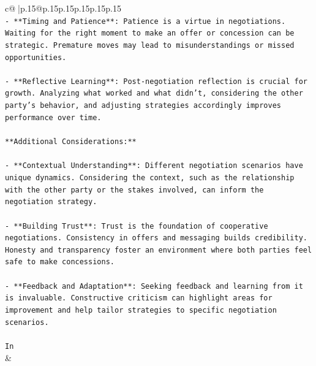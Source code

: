 \documentclass{article}
\begin{document}
{\begin{supertabular}{c@{$\;$}|p{.15\linewidth}@{}p{.15\linewidth}p{.15\linewidth}p{.15\linewidth}p{.15\linewidth}p{.15\linewidth}}
{{{\\ 
\texttt{{-} **Timing and Patience**: Patience is a virtue in negotiations. Waiting for the right moment to make an offer or concession can be strategic. Premature moves may lead to misunderstandings or missed opportunities.} \\
\\ 
\texttt{{-} **Reflective Learning**: Post{-}negotiation reflection is crucial for growth. Analyzing what worked and what didn't, considering the other party's behavior, and adjusting strategies accordingly improves performance over time.} \\
\\ 
\texttt{**Additional Considerations:**} \\
\\ 
\texttt{{-} **Contextual Understanding**: Different negotiation scenarios have unique dynamics. Considering the context, such as the relationship with the other party or the stakes involved, can inform the negotiation strategy.} \\
\\ 
\texttt{{-} **Building Trust**: Trust is the foundation of cooperative negotiations. Consistency in offers and messaging builds credibility. Honesty and transparency foster an environment where both parties feel safe to make concessions.} \\
\\ 
\texttt{{-} **Feedback and Adaptation**: Seeking feedback and learning from it is invaluable. Constructive criticism can highlight areas for improvement and help tailor strategies to specific negotiation scenarios.} \\
\\ 
\texttt{In} \\
            }
        }
    }
    & \\ \\


\end{supertabular}}
\end{document}
